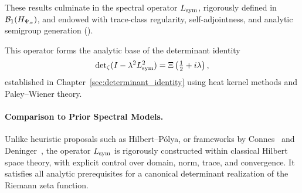 These results culminate in the spectral operator \( L_{\mathrm{sym}} \), rigorously defined in \( \mathcal{B}_1(H_{\Psi_\alpha}) \), and endowed with trace-class regularity, self-adjointness, and analytic semigroup generation ().

\medskip

This operator forms the analytic base of the determinant identity
\[
\det\nolimits_{\zeta}(I - \lambda^2 L_{\mathrm{sym}}^2) = \Xi\left(\tfrac{1}{2} + i\lambda\right),
\]
established in Chapter~\ref{sec:determinant_identity} using heat kernel methods and Paley--Wiener theory.

\paragraph{Comparison to Prior Spectral Models.}
Unlike heuristic proposals such as Hilbert--Pólya, or frameworks by Connes~\cite{Connes1999TraceFormula} and Deninger~\cite{Deninger1998Frobenius}, the operator \( L_{\mathrm{sym}} \) is rigorously constructed within classical Hilbert space theory, with explicit control over domain, norm, trace, and convergence. It satisfies all analytic prerequisites for a canonical determinant realization of the Riemann zeta function.
